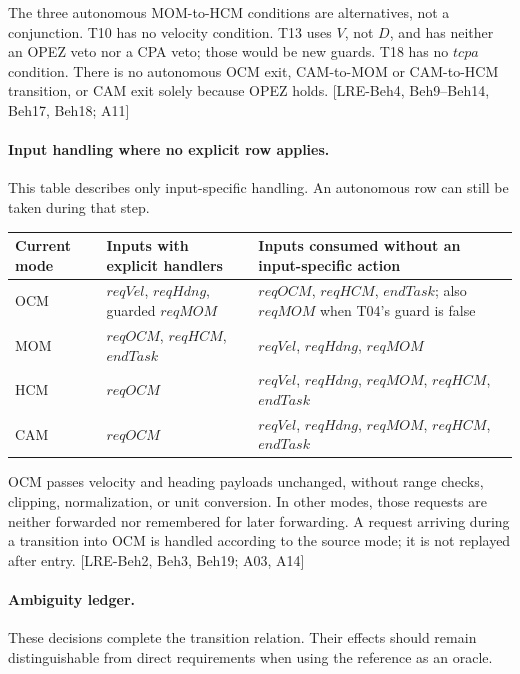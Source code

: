 \documentclass[10pt,a4paper]{article}
\begin{document}
The three autonomous MOM-to-HCM conditions are alternatives, not a conjunction. T10 has no velocity condition. T13 uses $\mathit{V}$, not $\mathit{D}$, and has neither an OPEZ veto nor a CPA veto; those would be new guards. T18 has no $\mathit{tcpa}$ condition. There is no autonomous OCM exit, CAM-to-MOM or CAM-to-HCM transition, or CAM exit solely because OPEZ holds. [LRE-Beh4, Beh9--Beh14, Beh17, Beh18; A11]

\paragraph{Input handling where no explicit row applies.} This table describes only input-specific handling. An autonomous row can still be taken during that step.

\begin{longtable}{@{}L{0.12\textwidth}L{0.34\textwidth}L{0.46\textwidth}@{}}
\toprule
\textbf{Current mode} & \textbf{Inputs with explicit handlers} & \textbf{Inputs consumed without an input-specific action} \\
\midrule
\endhead

OCM & $\mathit{reqVel}$, $\mathit{reqHdng}$, guarded $\mathit{reqMOM}$ & $\mathit{reqOCM}$, $\mathit{reqHCM}$, $\mathit{endTask}$; also $\mathit{reqMOM}$ when T04's guard is false \\
MOM & $\mathit{reqOCM}$, $\mathit{reqHCM}$, $\mathit{endTask}$ & $\mathit{reqVel}$, $\mathit{reqHdng}$, $\mathit{reqMOM}$ \\
HCM & $\mathit{reqOCM}$ & $\mathit{reqVel}$, $\mathit{reqHdng}$, $\mathit{reqMOM}$, $\mathit{reqHCM}$, $\mathit{endTask}$ \\
CAM & $\mathit{reqOCM}$ & $\mathit{reqVel}$, $\mathit{reqHdng}$, $\mathit{reqMOM}$, $\mathit{reqHCM}$, $\mathit{endTask}$ \\
\bottomrule
\end{longtable}

OCM passes velocity and heading payloads unchanged, without range checks, clipping, normalization, or unit conversion. In other modes, those requests are neither forwarded nor remembered for later forwarding. A request arriving during a transition into OCM is handled according to the source mode; it is not replayed after entry. [LRE-Beh2, Beh3, Beh19; A03, A14]

\paragraph{Ambiguity ledger.} These decisions complete the transition relation. Their effects should remain distinguishable from direct requirements when using the reference as an oracle.
\end{document}
